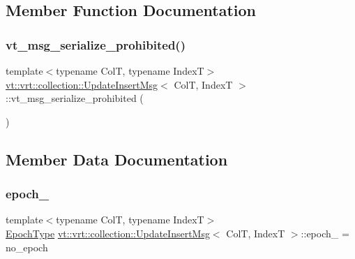 \subsection{Member Function Documentation}
\mbox{\label{structvt_1_1vrt_1_1collection_1_1_update_insert_msg_af1ecb3c994e2ef8e5e09a2cfbb0559b6}} 
\subsubsection{\texorpdfstring{vt\+\_\+msg\+\_\+serialize\+\_\+prohibited()}{vt\_msg\_serialize\_prohibited()}}
{\footnotesize\ttfamily template$<$typename ColT, typename IndexT$>$ \\
\hyperlink{structvt_1_1vrt_1_1collection_1_1_update_insert_msg}{vt\+::vrt\+::collection\+::\+Update\+Insert\+Msg}$<$ ColT, IndexT $>$\+::vt\+\_\+msg\+\_\+serialize\+\_\+prohibited (\begin{DoxyParamCaption}{ }\end{DoxyParamCaption})}



\subsection{Member Data Documentation}
\mbox{\label{structvt_1_1vrt_1_1collection_1_1_update_insert_msg_a6639021b34fd80c4c17a65b7fe9034f6}} 
\subsubsection{\texorpdfstring{epoch\+\_\+}{epoch\_}}
{\footnotesize\ttfamily template$<$typename ColT, typename IndexT$>$ \\
\hyperlink{namespacevt_a985a5adf291c34a3ca263b3378388236}{Epoch\+Type} \hyperlink{structvt_1_1vrt_1_1collection_1_1_update_insert_msg}{vt\+::vrt\+::collection\+::\+Update\+Insert\+Msg}$<$ ColT, IndexT $>$\+::epoch\+\_\+ = no\+\_\+epoch}

